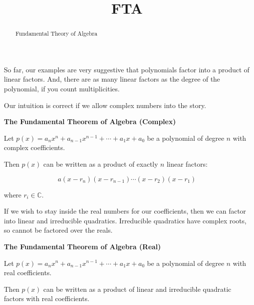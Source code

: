 \documentclass{ximera}
\title{FTA}
\begin{document}
\begin{abstract}
Fundamental Theory of Algebra
\end{abstract}
\maketitle






So far, our examples are very suggestive that polynomials factor into a product of linear factors.  And, there are as many linear factors as the degree of the polynomial, if you count multiplicities. 



Our intuition is correct if we allow complex numbers into the story. 


\begin{theorem} \textbf{\textcolor{-red!75!green}{The Fundamental Theorem of Algebra (Complex)}} 



Let $p(x) = a_n x^n + a_{n-1} x^{n-1} + \cdots + a_1 x + a_0$ be a polynomial of degree $n$ with complex coefficients. 


Then $p(x)$ can be written as a product of exactly $n$ linear factors:

\[
 a (x - r_n) (x - r_{n-1}) \cdots (x - r_2)  (x - r_1) 
\]


where $r_i \in \mathbb{C}$.


\end{theorem}




If we wish to stay inside the real numbers for our coefficients, then we can factor into linear and irreducible quadratics.  Irreducible quadratics have complex roots, so cannot be factored over the reals.



\begin{theorem} \textbf{\textcolor{-red!75!green}{The Fundamental Theorem of Algebra (Real)}} 



Let $p(x) = a_n x^n + a_{n-1} x^{n-1} + \cdots + a_1 x + a_0$ be a polynomial of degree $n$ with real coefficients. 


Then $p(x)$ can be written as a product of linear and irreducible quadratic factors with real coefficients.


\end{theorem}
\end{document}
